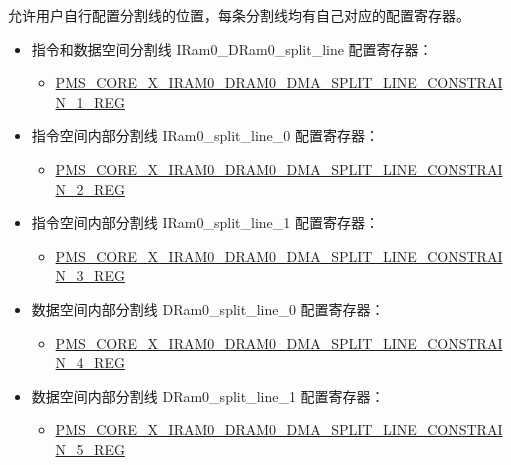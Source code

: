 \documentclass[main\_\_CN.tex]{subfiles}
\begin{document}
\chipname{} 允许用户自行配置分割线的位置，每条分割线均有自己对应的配置寄存器。
\begin{itemize}
    \item 指令和数据空间分割线 IRam0\_DRam0\_split\_line 配置寄存器：
    \begin{itemize}
        \item \hyperref[regdesc:PMSCOREXIRAM0DRAM0DMASPLITLINECONSTRAIN1REG]{PMS\_CORE\_X\_IRAM0\_DRAM0\_DMA\_SPLIT\_LINE\_CONSTRAIN\_1\_REG}
    \end{itemize}
    \item 指令空间内部分割线 IRam0\_split\_line\_0  配置寄存器：
    \begin{itemize}
        \item \hyperref[regdesc:PMSCOREXIRAM0DRAM0DMASPLITLINECONSTRAIN2REG]{PMS\_CORE\_X\_IRAM0\_DRAM0\_DMA\_SPLIT\_LINE\_CONSTRAIN\_2\_REG}
    \end{itemize}
    \item 指令空间内部分割线 IRam0\_split\_line\_1  配置寄存器：
    \begin{itemize}
        \item \hyperref[regdesc:PMSCOREXIRAM0DRAM0DMASPLITLINECONSTRAIN3REG]{PMS\_CORE\_X\_IRAM0\_DRAM0\_DMA\_SPLIT\_LINE\_CONSTRAIN\_3\_REG}
    \end{itemize}
    \item 数据空间内部分割线 DRam0\_split\_line\_0  配置寄存器：
    \begin{itemize}
        \item \hyperref[regdesc:PMSCOREXIRAM0DRAM0DMASPLITLINECONSTRAIN4REG]{PMS\_CORE\_X\_IRAM0\_DRAM0\_DMA\_SPLIT\_LINE\_CONSTRAIN\_4\_REG}
    \end{itemize}
    \item 数据空间内部分割线 DRam0\_split\_line\_1  配置寄存器：
    \begin{itemize}
        \item \hyperref[regdesc:PMSCOREXIRAM0DRAM0DMASPLITLINECONSTRAIN5REG]{PMS\_CORE\_X\_IRAM0\_DRAM0\_DMA\_SPLIT\_LINE\_CONSTRAIN\_5\_REG}
    \end{itemize}
\end{itemize}
\end{document}
